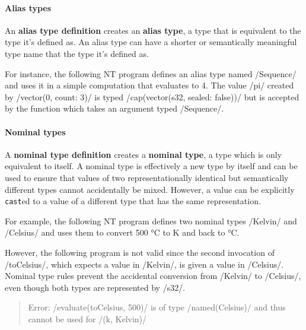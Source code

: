 \documentclass[main.tex]{subfiles}
\begin{document}
\paragraph{Alias types} An \textbf{alias type definition} creates an \textbf{alias type}, a type that is equivalent to the type it's defined as. An alias type can have a shorter or semantically meaningful type name that the type it's defined as.

For instance, the following NT program defines an alias type named \iil/Sequence/ and uses it in a simple computation that evaluates to 4. The value \iil/pi/ created by \iil/vector(0, count: 3)/ is typed \iil/cap(vector(s32, sealed: false))/ but is accepted by the function which takes an argument typed \iil/Sequence/.

\paragraph{Nominal types} A \textbf{nominal type definition} creates a \textbf{nominal type}, a type which is only equivalent to itself. A nominal type is effectively a new type by itself and can be used to ensure that values of two representationally identical but semantically different types cannot accidentally be mixed. However, a value can be explicitly \texttt{cast}ed to a value of a different type that has the same representation.

For example, the following NT program defines two nominal types \iil/Kelvin/ and \iil/Celsius/ and uses them to convert 500 °C to K and back to °C.

However, the following program is not valid since the second invocation of \iil/toCelsius/, which expects a value in \iil/Kelvin/, is given a value in \iil/Celsius/. Nominal type rules prevent the accidental conversion from \iil/Kelvin/ to \iil/Celsius/, even though both types are represented by \iil/s32/.

\begin{quote}
	\ttfamily\footnotesize
	Error: \iil/evaluate(toCelsius, 500)/ is of type \iil/named(Celsius)/ and thus cannot be used for \iil/(k, Kelvin)/
\end{quote}
\end{document}
